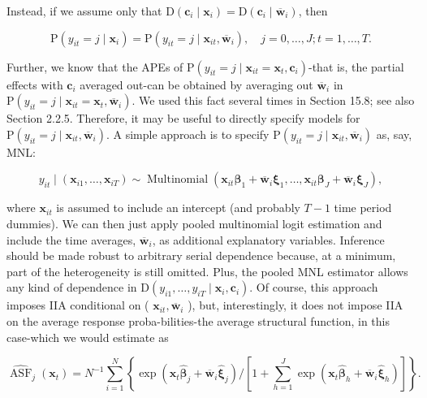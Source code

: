 \documentclass[10pt]{article}
\begin{document}
Instead, if we assume only that $\mathrm{D}\left(\mathbf{c}_{i} \mid \mathbf{x}_{i}\right)=\mathrm{D}\left(\mathbf{c}_{i} \mid \overline{\mathbf{w}}_{i}\right)$, then


\begin{equation*}
\mathrm{P}\left(y_{i t}=j \mid \mathbf{x}_{i}\right)=\mathrm{P}\left(y_{i t}=j \mid \mathbf{x}_{i t}, \overline{\mathbf{w}}_{i}\right), \quad j=0, \ldots, J ; t=1, \ldots, T . \tag{16.18}
\end{equation*}


Further, we know that the APEs of $\mathrm{P}\left(y_{i t}=j \mid \mathbf{x}_{i t}=\mathbf{x}_{t}, \mathbf{c}_{i}\right)$-that is, the partial effects with $\mathbf{c}_{i}$ averaged out-can be obtained by averaging out $\overline{\mathbf{w}}_{i}$ in $\mathrm{P}\left(y_{i t}=j \mid \mathbf{x}_{i t}=\mathbf{x}_{t}, \overline{\mathbf{w}}_{i}\right)$. We used this fact several times in Section 15.8; see also Section 2.2.5. Therefore, it may be useful to directly specify models for $\mathrm{P}\left(y_{i t}=j \mid \mathbf{x}_{i t}, \overline{\mathbf{w}}_{i}\right)$. A simple approach is to specify $\mathrm{P}\left(y_{i t}=j \mid \mathbf{x}_{i t}, \overline{\mathbf{w}}_{i}\right)$ as, say, MNL:


\begin{equation*}
y_{i t} \mid\left(\mathbf{x}_{i 1}, \ldots, \mathbf{x}_{i T}\right) \sim \operatorname{Multinomial}\left(\mathbf{x}_{i t} \boldsymbol{\beta}_{1}+\overline{\mathbf{w}}_{i} \boldsymbol{\xi}_{1}, \ldots, \mathbf{x}_{i t} \boldsymbol{\beta}_{J}+\overline{\mathbf{w}}_{i} \boldsymbol{\xi}_{J}\right), \tag{16.19}
\end{equation*}


where $\mathbf{x}_{i t}$ is assumed to include an intercept (and probably $T-1$ time period dummies). We can then just apply pooled multinomial logit estimation and include the time averages, $\overline{\mathbf{w}}_{i}$, as additional explanatory variables. Inference should be made robust to arbitrary serial dependence because, at a minimum, part of the heterogeneity is still omitted. Plus, the pooled MNL estimator allows any kind of dependence in $\mathrm{D}\left(y_{i 1}, \ldots, y_{i T} \mid \mathbf{x}_{i}, \mathbf{c}_{i}\right)$. Of course, this approach imposes IIA conditional on ( $\mathbf{x}_{i t}, \overline{\mathbf{w}}_{i}$ ), but, interestingly, it does not impose IIA on the average response proba-bilities-the average structural function, in this case-which we would estimate as


\begin{equation*}
\widehat{\operatorname{ASF}}_{j}\left(\mathbf{x}_{t}\right)=N^{-1} \sum_{i=1}^{N}\left\{\exp \left(\mathbf{x}_{t} \hat{\boldsymbol{\beta}}_{j}+\overline{\mathbf{w}}_{i} \hat{\boldsymbol{\xi}}_{j}\right) /\left[1+\sum_{h=1}^{J} \exp \left(\mathbf{x}_{t} \hat{\boldsymbol{\beta}}_{h}+\overline{\mathbf{w}}_{i} \hat{\boldsymbol{\xi}}_{h}\right)\right]\right\} . \tag{16.20}
\end{equation*}
\end{document}
